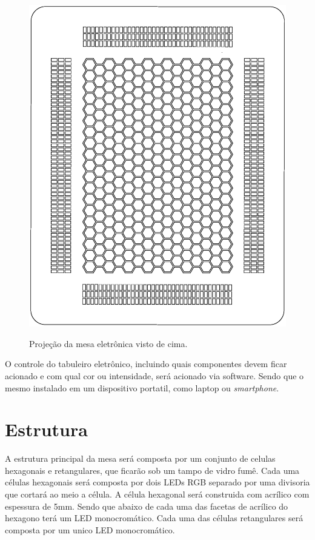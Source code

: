 \documentclass[a4paper,10pt]{article}
\begin{document}
\begin{center}
\begin{figure}[h!]
	\center
	\includegraphics[angle=0, scale=0.40]{./img/layout-v02.ps}
	\label{figura_layout}
	\caption{Projeção da mesa eletrônica visto de cima.}
\end{figure}
\end{center}

O controle do tabuleiro eletrônico, incluindo quais componentes devem ficar acionado e com qual cor ou intensidade, será acionado via software. Sendo que o mesmo instalado em um dispositivo portatil, como laptop ou {\it smartphone}.

\section{Estrutura}


A estrutura principal da mesa será composta por um conjunto de celulas hexagonais e retangulares, que ficarão sob um tampo de vidro fumê. 
Cada uma células hexagonais será composta por dois LEDs RGB separado por uma divisoria que cortará ao meio a célula. 
A célula hexagonal será construida com acrílico com espessura de 5mm. Sendo que abaixo de cada uma das facetas de acrílico do hexagono terá um LED monocro\-mático.
Cada uma das células retangulares será composta por um unico LED monocromático. \\
\end{document}
